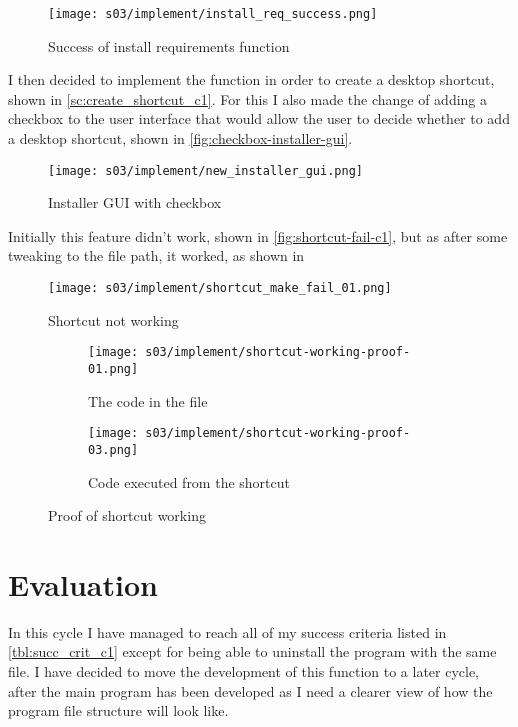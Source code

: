     \begin{figure}[!ht]
        \centering
        \texttt{[image: s03/implement/install\_req\_success.png]}
        \caption{Success of install requirements function}
        \label{fig:install-req-success}
    \end{figure}

    I then decided to implement the function in order to create a desktop shortcut, shown in \autoref{sc:create_shortcut_c1}. For this I also made the change of adding a checkbox to the user interface that would allow the user to decide whether to add a desktop shortcut, shown in \autoref{fig:checkbox-installer-gui}. 


    \begin{figure}[!ht]
        \centering
        \texttt{[image: s03/implement/new\_installer\_gui.png]}
        \caption{Installer GUI with checkbox}
        \label{fig:checkbox-installer-gui}
    \end{figure}

    Initially this feature didn't work, shown in \autoref{fig:shortcut-fail-c1}, but as after some tweaking to the file path, it worked, as shown in 

    \begin{figure}[!ht]
        \centering
        \texttt{[image: s03/implement/shortcut\_make\_fail\_01.png]}
        \caption{Shortcut not working}
        \label{fig:shortcut-fail-c1}
    \end{figure}

    \begin{figure}[!ht]
        \centering
        \begin{subfigure}{.4\textwidth}
            \centering
            \texttt{[image: s03/implement/shortcut-working-proof-01.png]}
            \caption{The code in the file}
            \label{fig:sc-working-proof-1-c1}
        \end{subfigure}%
        \begin{subfigure}{.4\textwidth}
            \centering
            \texttt{[image: s03/implement/shortcut-working-proof-03.png]}
            \caption{Code executed from the shortcut}
            \label{fig:}
        \end{subfigure}%
        \caption{Proof of shortcut working}
    \end{figure}



\section{Evaluation}
    In this cycle I have managed to reach all of my success criteria listed in \autoref{tbl:succ_crit_c1} except for being able to uninstall the program with the same file. I have decided to move the development of this function to a later cycle, after the main program has been developed as I need a clearer view of how the program file structure will look like. 
